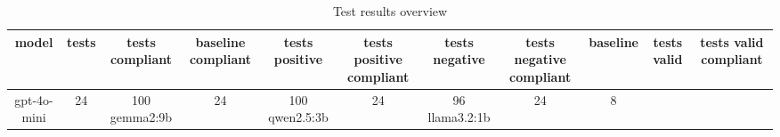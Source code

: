 
  \begin{table}[h!]
  \centering
  \begin{tabular}{|c|c|c|c|c|c|c|c|c|c|c|}
  \hline
  model & tests & tests compliant & baseline compliant & tests positive & tests positive compliant & tests negative & tests negative compliant & baseline & tests valid & tests valid compliant \\
  \hline
  gpt-4o-mini & 24 & 100%
\hline
gemma2:9b & 24 & 100%
\hline
qwen2.5:3b & 24 & 96%
\hline
llama3.2:1b & 24 & 8%
  \end{tabular}
  \caption{Test results overview}
  
  \end{table}
  